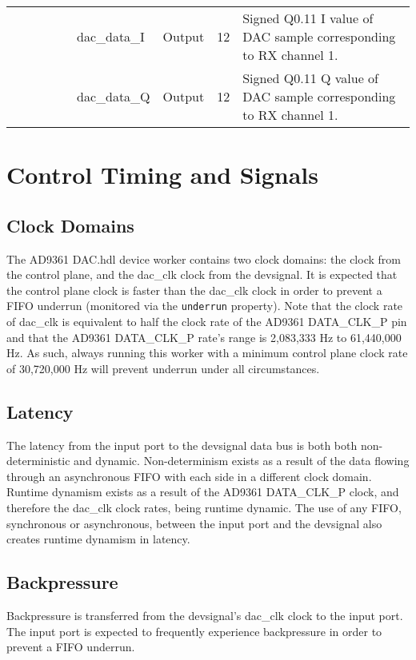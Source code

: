 \documentclass{article}
\def\devsignal{devsignal}
\def\Comp{AD9361 DAC}
\begin{document}
\begin{landscape}
\begin{scriptsize}
\begin{tabular}{|p{1.75cm}|p{2.25cm}|p{1.25cm}|p{1.25cm}|p{1.25cm}|p{3cm}|p{1.4cm}|p{0.9cm}|p{6.88cm}|}
			\cline{6-9}
			&             &        &     &      & dac\_data\_I & Output    & 12     & Signed Q0.11 I value of DAC sample corresponding to RX channel 1. \\
			\cline{6-9}
			&             &        &     &      & dac\_data\_Q & Output    & 12     & Signed Q0.11 Q value of DAC sample corresponding to RX channel 1. \\
			\hline
		\end{tabular}
	\end{scriptsize}
\end{landscape}

\section*{Control Timing and Signals}
\subsection*{Clock Domains}
The \Comp{}.hdl device worker contains two clock domains: the clock from the control plane, and the dac\_clk clock from the \devsignal{}. It is expected that the control plane clock is faster than the dac\_clk clock in order to prevent a FIFO underrun (monitored via the \verb+underrun+ property). Note that the clock rate of dac\_clk is equivalent to half the clock rate of the AD9361 DATA\_CLK\_P pin\cite{dac_sub_comp_datasheet} and that the AD9361 DATA\_CLK\_P rate's range is 2,083,333 Hz to 61,440,000 Hz. As such, always running this worker with a minimum control plane clock rate of 30,720,000 Hz will prevent underrun under all circumstances.
\subsection*{Latency}
The latency from the input port to the \devsignal{} data bus is both both non-deterministic and dynamic. Non-determinism exists as a result of the data flowing through an asynchronous FIFO with each side in a different clock domain. Runtime dynamism exists as a result of the AD9361 DATA\_CLK\_P clock, and therefore the dac\_clk clock rates, being runtime dynamic. The use of any FIFO, synchronous or asynchronous, between the input port and the \devsignal{} also creates runtime dynamism in latency.
\subsection*{Backpressure}
Backpressure is transferred from the \devsignal{}'s dac\_clk clock to the input port. The input port is expected to frequently experience backpressure in order to prevent a FIFO underrun.
\end{document}
